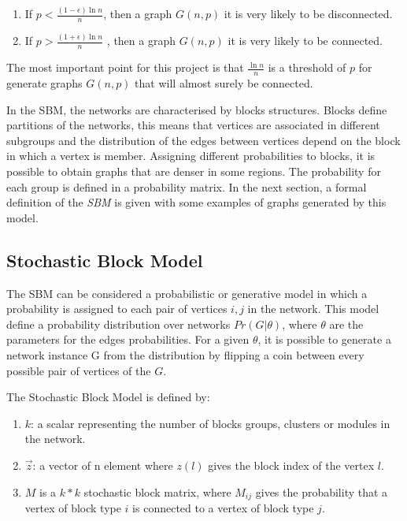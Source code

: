 \begin{enumerate}
\item If $p<{\tfrac {(1-\epsilon )\ln n}{n}}$, then a graph $G(n, p)$ it is very likely to be disconnected.
\item If $p>{\tfrac {(1+\epsilon )\ln n}{n}}$ , then a graph $G(n, p)$ it is very likely to be connected.
\end{enumerate}

The most important point for this project is that ${\tfrac {\ln n}{n}}$ is a threshold of $p$ for generate graphs $G(n, p)$ that will almost surely be connected. 

In the SBM, the networks are characterised by blocks structures. Blocks define partitions of the networks, this means that vertices are associated in different subgroups and the distribution of the edges between vertices depend on the block in which a vertex is member. Assigning different probabilities to blocks, it is possible to obtain graphs that are denser in some regions. The probability for each group is defined in a probability matrix. In the next section, a formal definition of the \textit{SBM} is given with some examples of graphs generated by this model.

\subsection{Stochastic Block Model}

The SBM can be considered a probabilistic or generative model in which a probability is assigned to each pair of vertices $i,j$ in the network. This model define a probability distribution over networks $Pr(G | \theta)$, where $\theta$ are the parameters for the edges probabilities. For a given $\theta$, it is possible to generate a network instance G from the distribution by flipping a coin between every possible pair of vertices of the $G$. 

The Stochastic Block Model is defined by: 
\begin{enumerate}

    \item $k$: a scalar representing the number of blocks groups, clusters or modules in the network.
    \item $\overrightarrow{z}$: a vector of n element where $z(l)$ gives the block index of the vertex $l$.
    \item $M$ is a $k * k$ stochastic block matrix, where $M_{ij}$ gives the probability that a vertex of block type $i$ is connected to a vertex of block type $j$.
\end{enumerate}



